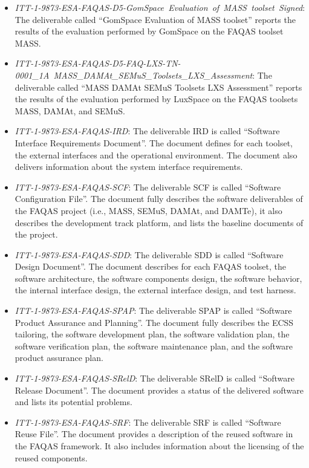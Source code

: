 \begin{itemize}
	\item \emph{ITT-1-9873-ESA-FAQAS-D5-GomSpace\ Evaluation\ of\ MASS\ toolset\ Signed}: The deliverable called ``GomSpace Evaluation of MASS toolset'' reports the results of the evaluation performed by GomSpace on the FAQAS toolset MASS.

	\item \emph{ITT-1-9873-ESA-FAQAS-D5-FAQ-LXS-TN-0001\_1A\ MASS\_DAMAt\_SEMuS\_Toolsets\_LXS\_Assessment}: The deliverable called ``MASS DAMAt SEMuS Toolsets LXS Assessment'' reports the results of the evaluation performed by LuxSpace on the FAQAS toolsets MASS, DAMAt, and SEMuS.

	\item \emph{ITT-1-9873-ESA-FAQAS-IRD}: The deliverable IRD is called ``Software Interface Requirements Document''. The document defines for each toolset, the external interfaces and the operational environment. The document also delivers information about the system interface requirements.

	\item \emph{ITT-1-9873-ESA-FAQAS-SCF}: The deliverable SCF is called ``Software Configuration File''. The document fully describes the software deliverables of the FAQAS project (i.e., MASS, SEMuS, DAMAt, and DAMTe), it also describes the development track platform, and lists the baseline documents of the project.

	\item \emph{ITT-1-9873-ESA-FAQAS-SDD}: The deliverable SDD is called ``Software Design Document''. The document describes for each FAQAS toolset, the software architecture, the software components design, the software behavior, the internal interface design, the external interface design, and test harness.

	\item \emph{ITT-1-9873-ESA-FAQAS-SPAP}: The deliverable SPAP is called ``Software Product Assurance and Planning''. The document fully describes the ECSS tailoring, the software development plan, the software validation plan, the software verification plan, the software maintenance plan, and the software product assurance plan.

	\item \emph{ITT-1-9873-ESA-FAQAS-SRelD}: The deliverable SRelD is called ``Software Release Document''. The document provides a status of the delivered software and lists its potential problems.

	\item \emph{ITT-1-9873-ESA-FAQAS-SRF}: The deliverable SRF is called ``Software Reuse File''. The document provides a description of the reused software in the FAQAS framework. It also includes information about the licensing of the reused components.


\end{itemize}
